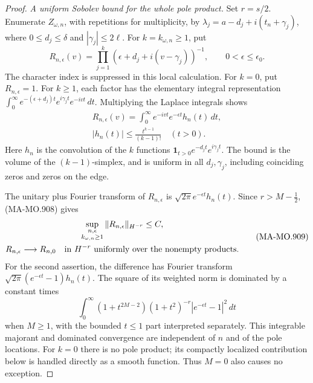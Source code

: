 \begin{proof}
\emph{A uniform Sobolev bound for the whole pole product.}
Set \(r=s/2\). Enumerate \(Z_{\omega,n}\),
with repetitions for multiplicity, by
\(\lambda_j=a-d_j+i(t_n+\gamma_j)\),
where \(0\le d_j\le\delta\) and
\(|\gamma_j|\le2\ell\).
For \(k=k_{\omega,n}\ge1\), put
\[
 R_{n,\epsilon}(v)
       =\prod_{j=1}^k
                    (\epsilon+d_j+i(v-\gamma_j))^{-1},
                  \qquad 0<\epsilon\le\epsilon_0 .
 \tag{MA-MO.907}
\]
The character index is suppressed in this local calculation.
For \(k=0\), put \(R_{n,\epsilon}=1\).
For \(k\ge1\), each factor has the elementary
integral representation
\(\int_0^\infty e^{-(\epsilon+d_j)t}
                  e^{i\gamma_jt}e^{-ivt}\,dt\).
Multiplying the Laplace integrals shows
\[
 \begin{gathered}
 R_{n,\epsilon}(v)
       =\int_0^\infty e^{-ivt}e^{-\epsilon t}h_n(t)\,dt,\\
 |h_n(t)|\le\frac{t^{k-1}}{(k-1)!}\quad(t>0).
 \end{gathered}
 \tag{MA-MO.908}
\]
Here \(h_n\) is the convolution of the \(k\)
functions \(\mathbf1_{t>0}e^{-d_jt}e^{i\gamma_jt}\).
The bound is the volume of the \((k-1)\)-simplex,
and is uniform in all \(d_j,\gamma_j\), including
coinciding zeros and zeros on the edge.

The unitary plus Fourier transform of
\(R_{n,\epsilon}\) is
\(\sqrt{2\pi}e^{-\epsilon t}h_n(t)\).
Since \(r>M-\tfrac12\), (MA-MO.908) gives
\[
 \begin{gathered}
 \sup_{\substack{n,\epsilon\\k_{\omega,n}\ge1}}
                    \|R_{n,\epsilon}\|_{H^{-r}}\le C,\\
 R_{n,\epsilon}\longrightarrow R_{n,0}
             \quad\hbox{in }H^{-r}
             \text{ uniformly over the nonempty products}.
 \end{gathered}
 \tag{MA-MO.909}
\]
For the second assertion, the difference has
Fourier transform
\(\sqrt{2\pi}(e^{-\epsilon t}-1)h_n(t)\).
The square of its weighted norm is dominated
by a constant times
\[
 \int_0^\infty
    (1+t^{2M-2})(1+t^2)^{-r}
                         |e^{-\epsilon t}-1|^2\,dt
\]
when \(M\ge1\), with the bounded \(t\le1\)
part interpreted separately. This integrable
majorant and dominated convergence are
independent of \(n\) and of the pole locations.
For \(k=0\) there is no pole product; its
compactly localized contribution below is
handled directly as a smooth function.
Thus \(M=0\) also causes no exception.


\end{proof}
